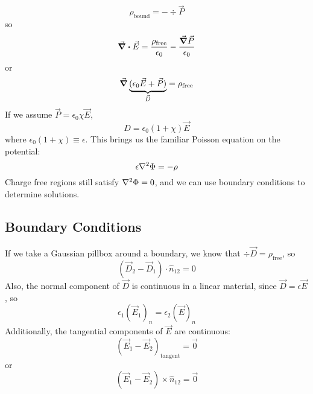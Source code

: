 \documentclass[a4paper,twoside,master.tex]{subfiles}
\begin{document}
\begin{equation}
    \rho_{\text{bound}} = - \div{ \vec{P}}
\end{equation}
so
\begin{equation}
    \div{ \vec{E}} = \frac{\rho_{\text{free}}}{\epsilon_0} - \frac{\grad{ \vec{P}}}{\epsilon_0}
\end{equation}
or
\begin{equation}
    \grad{\underbrace{(\epsilon_0 \vec{E} + \vec{P})}_{ \vec{D}}} = \rho_{\text{free}}
\end{equation}
If we assume $ \vec{P} = \epsilon_0 \chi \vec{E}$,
\begin{equation}
    D = \epsilon_0 (1 + \chi) \vec{E}
\end{equation}
where $ \epsilon_0 (1+ \chi) \equiv \epsilon$. This brings us the familiar Poisson equation on the potential:
\begin{equation}
    \epsilon \laplacian{\Phi} = - \rho
\end{equation}
Charge free regions still satisfy $ \laplacian{\Phi} = 0$, and we can use boundary conditions to determine solutions. 

\subsection{Boundary Conditions}
\label{subsec:boundary_conditions}
If we take a Gaussian pillbox around a boundary, we know that $ \div{ \vec{D}} = \rho_{\text{free}}$, so
\begin{equation}
    ( \vec{D}_{2} - \vec{D}_{1} ) \cdot \hat{n}_{12} = 0
\end{equation}
Also, the normal component of $ \vec{D}$ is continuous in a linear material, since $ \vec{D} = \epsilon \vec{E}$, so
\begin{equation}
    \epsilon_1( \vec{E}_1 )_{n} = \epsilon_2( \vec{E} )_{n}
\end{equation}
Additionally, the tangential components of $ \vec{E}$ are continuous:
\begin{equation}
    ( \vec{E}_1 - \vec{E}_2 )_{\text{tangent}} = \vec{0}
\end{equation}
or
\begin{equation}
    ( \vec{E}_1 - \vec{E}_2) \times \hat{n}_{12} = \vec{0}
\end{equation}
\end{document}
